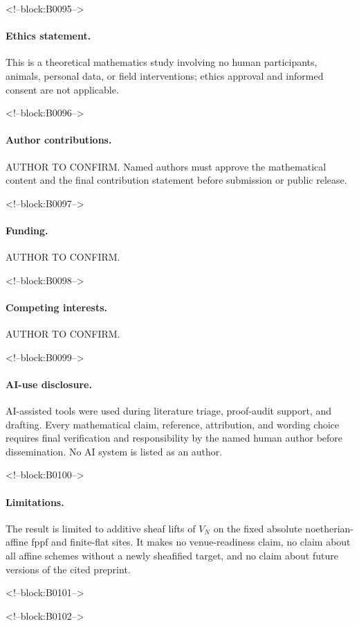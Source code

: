 \documentclass[11pt]{article}
\theoremstyle{definition}
\begin{document}
<!--block:B0095-->
\paragraph{Ethics statement.}
This is a theoretical mathematics study involving no human participants,
animals, personal data, or field interventions; ethics approval and
informed consent are not applicable.

<!--block:B0096-->
\paragraph{Author contributions.}
AUTHOR TO CONFIRM.  Named authors must approve the mathematical content and
the final contribution statement before submission or public release.

<!--block:B0097-->
\paragraph{Funding.}
AUTHOR TO CONFIRM.

<!--block:B0098-->
\paragraph{Competing interests.}
AUTHOR TO CONFIRM.

<!--block:B0099-->
\paragraph{AI-use disclosure.}
AI-assisted tools were used during literature triage, proof-audit support,
and drafting.  Every mathematical claim, reference, attribution, and
wording choice requires final verification and responsibility by the named
human author before dissemination.  No AI system is listed as an author.

<!--block:B0100-->
\paragraph{Limitations.}
The result is limited to additive sheaf lifts of \(V_N\) on the fixed
absolute noetherian-affine fppf and finite-flat sites.  It makes no
venue-readiness claim, no claim about all affine schemes without a newly
sheafified target, and no claim about future versions of the cited
preprint.

<!--block:B0101-->



<!--block:B0102-->
\end{document}
